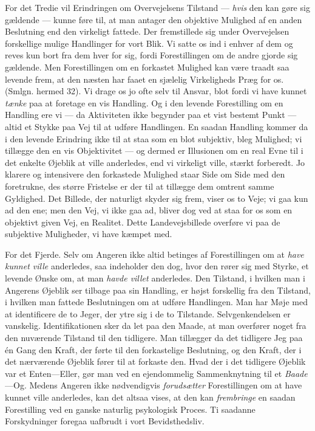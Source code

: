 \documentclass[12pt,a4paper,openany]{book}
\newcommand{\opage}[1]{\marginnote{\footnotesize\textit{[#1]}}}
\begin{document}
For det Tredie vil Erindringen om Overvejelsens Tilstand --- \emph{hvis} den
kan gøre sig gældende --- kunne føre til, at man antager den objektive Mulighed
af en anden Beslutning end den virkeligt fattede. Der fremstillede sig under
Overvejelsen forskellige mulige Handlinger for vort Blik. Vi satte os ind i
enhver af dem og reves kun bort fra dem hver for sig, fordi Forestillingen om
de andre gjorde sig gældende. Men Forestillingen om en forkastet Mulighed kan
være traadt saa levende frem, at den næsten har faaet en sjælelig Virkeligheds
Præg for os. (Smlgn. hermed 32). Vi drage os jo ofte selv til Ansvar, blot
fordi vi have kunnet \emph{tænke} paa at foretage en vis Handling. Og i den
levende Forestilling om en Handling ere vi --- da Aktiviteten ikke begynder paa
et vist bestemt Punkt --- altid et Stykke paa Vej til at udføre Handlingen. En
saadan Handling kommer da i den levende Erindring ikke til at staa som en blot
subjektiv, bleg Mulighed; vi tillægge den en vis Objektivitet --- og dermed er
Illusionen om en real Evne til i det enkelte Øjeblik at ville anderledes, end
vi virkeligt ville, stærkt forberedt. Jo klarere og intensivere den forkastede
Mulighed staar Side om Side med den foretrukne, des større Fristelse er der til
at tillægge dem omtrent samme Gyldighed. Det Billede, der naturligt skyder sig
frem, viser os to Veje; vi gaa kun ad den ene; men den Vej, vi ikke gaa ad,
bliver dog ved at staa for os som en objektivt given Vej, en Realitet. Dette
Landevejsbillede overføre vi paa de subjektive Muligheder, vi have kæmpet med.

For det Fjerde. Selv om Angeren ikke altid betinges af Forestillingen om at
\emph{have kunnet ville} anderledes, saa indeholder den dog, hvor den rører sig
med Styrke, et levende Ønske om, at man \emph{havde villet} anderledes. Den
Tilstand, i hvilken man i Angerens Øjeblik ser tilbage paa sin Handling, er
højst forskellig fra den Tilstand, i hvilken man fattede Beslutningen om at
udføre Handlingen. Man har Møje med at identificere de to Jeger, der ytre sig i
de to Tilstande. Selvgenkendelsen er vanskelig. Identifikationen sker da let
paa den Maade, at man overfører noget fra den nuværende Tilstand til den
tidligere. Man tillægger da det tidligere Jeg paa én Gang den Kraft, der
\setcounter{footnote}{0}%
\opage{95}førte til den forkastelige Beslutning, og den Kraft, der i det
nærværende Øjeblik fører til at forkaste den. Hvad der i det tidligere Øjeblik
var et Enten---Eller, gør man ved en ejendommelig Sammenknytning til et
\emph{Baade}---Og. Medens Angeren ikke nødvendigvis \emph{forudsætter}
Forestillingen om at have kunnet ville anderledes, kan det altsaa vises, at den
kan \emph{frembringe} en saadan Forestilling ved en ganske naturlig psykologisk
Proces. Ti saadanne Forskydninger foregaa uafbrudt i vort Bevidsthedsliv.
\end{document}
